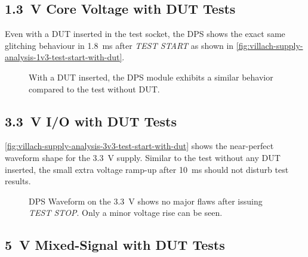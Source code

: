 \subsection{\SI{1.3}{\volt} Core Voltage with \acs{DUT} Tests}
\label{subsec:onsite-meas
urements-with-dut-1v3}

Even with a \ac{DUT} inserted in the test socket, the \ac{DPS} shows the exact
same glitching behaviour in \SI{1.8}{\milli\second} after \emph{TEST START} as
shown in \autoref{fig:villach-supply-analysis-1v3-test-start-with-dut}.

\begin{figure}[h!]
    \centering
    \caption[\SI{1.3}{\volt} Rail at \emph{TEST START} with \acs{DUT}]{
        With a \ac{DUT} inserted, the \ac{DPS} module exhibits a similar
        behavior compared to the test without \ac{DUT}.
    }
    \label{fig:villach-supply-analysis-1v3-test-start-with-dut}
\end{figure}

\subsection{\SI{3.3}{\volt} \acs{I/O} with \acs{DUT} Tests}
\label{subsec:onsite-measurements-with-dut-3v3}

\autoref{fig:villach-supply-analysis-3v3-test-start-with-dut} shows
the near-perfect waveform shape for the {\SI{3.3}{\volt}} supply.
Similar to the test without any \ac{DUT} inserted, the small extra voltage
ramp-up after \SI{10}{\milli\second} should not disturb test results.

\begin{figure}[h!]
    \centering
    \caption[\SI{1.3}{\volt} Rail at \emph{TEST START} with \acs{DUT}]{
        \ac{DPS} Waveform on the \SI{3.3}{\volt} shows no major flaws after
        issuing \emph{TEST STOP}.
        Only a minor voltage rise can be seen.
    }
    \label{fig:villach-supply-analysis-3v3-test-start-with-dut}
\end{figure}

\subsection{\SI{5}{\volt} Mixed-Signal with \acs{DUT} Tests}
\label{subsec:onsite-measurements-with-dut-5v0}

